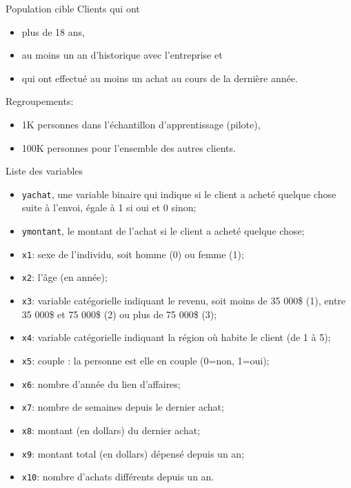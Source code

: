 \documentclass[
  ignorenonframetext,
]{beamer}
\providecommand{\tightlist}{%
  \setlength{\itemsep}{0pt}\setlength{\parskip}{0pt}}\usepackage{longtable,booktabs,array}
\begin{document}
\begin{frame}{Population cible}
\label{population-cible}
Clients qui ont

\begin{itemize}
\tightlist
\item
  plus de 18 ans,
\item
  au moins un an d'historique avec l'entreprise et
\item
  qui ont effectué au moins un achat au cours de la dernière année.
\end{itemize}

Regroupements:

\begin{itemize}
\tightlist
\item
  1K personnes dans l'échantillon d'apprentissage (pilote),
\item
  100K personnes pour l'ensemble des autres clients.
\end{itemize}
\end{frame}

\begin{frame}[fragile]{Liste des variables}
\label{liste-des-variables}
\footnotesize

\begin{itemize}
\tightlist
\item
  \texttt{yachat}, une variable binaire qui indique si le client a
  acheté quelque chose suite à l'envoi, égale à 1 si oui et 0 sinon;
\item
  \texttt{ymontant}, le montant de l'achat si le client a acheté quelque
  chose;
\item
  \texttt{x1}: sexe de l'individu, soit homme (0) ou femme (1);
\item
  \texttt{x2}: l'âge (en année);
\item
  \texttt{x3}: variable catégorielle indiquant le revenu, soit moins de
  35 000\$ (1), entre 35 000\$ et 75 000\$ (2) ou plus de 75 000\$ (3);
\item
  \texttt{x4}: variable catégorielle indiquant la région où habite le
  client (de 1 à 5);
\item
  \texttt{x5}: couple : la personne est elle en couple (0=non, 1=oui);
\item
  \texttt{x6}: nombre d'année du lien d'affaires;
\item
  \texttt{x7}: nombre de semaines depuis le dernier achat;
\item
  \texttt{x8}: montant (en dollars) du dernier achat;
\item
  \texttt{x9}: montant total (en dollars) dépensé depuis un an;
\item
  \texttt{x10}: nombre d'achats différents depuis un an.
\end{itemize}

\normalsize
\end{frame}
\end{document}
